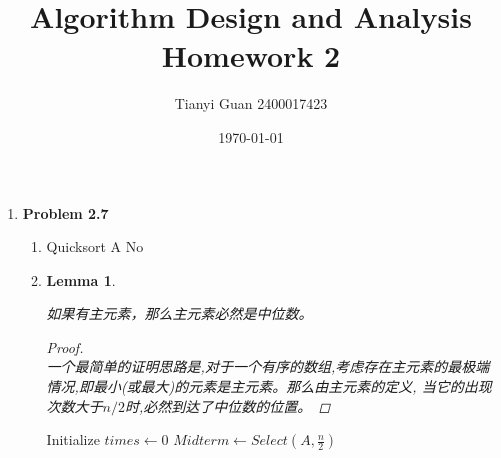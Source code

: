 \documentclass{ctexart}
\title{\vspace*{-1cm}Algorithm Design and Analysis Homework 2}
\author{Tianyi Guan 2400017423}
\date{\today}
\newtheorem{lemma}{Lemma}
\newtheorem{proof}{Proof}
\begin{document}
\maketitle
\vspace{-1cm}
\begin{enumerate}[label=\arabic*.]
    \item \textbf{Problem 2.7}
        \begin{enumerate}[label= (\arabic*)]
            \item \begin{algorithm}[H]
                \SetAlgoLined
                \caption{判断是否存在主元素(复杂度$O(n\log{n})$)}
                Quicksort A
                \Return No\;
            \end{algorithm}
            \item \begin{lemma}
            \hfill
            \begin{center}
            如果有主元素，那么主元素必然是中位数。
            \end{center}
            \begin{proof}
                \hfill \\
                一个最简单的证明思路是,对于一个有序的数组,考虑存在主元素的最极端情况,即最小(或最大)的元素是主元素。那么由主元素的定义,
                当它的出现次数大于$n/2$时,必然到达了中位数的位置。
            \end{proof}
            \end{lemma}
            \begin{algorithm}[H]
                \SetAlgoLined
                \caption{判断是否存在主元素(复杂度$O(n)$)} 
                Initialize $times\leftarrow 0$\;
                $Midterm\leftarrow Select (A,\frac{n}{2})$

\end{algorithm}
\end{enumerate}
\end{enumerate}
\end{document}
